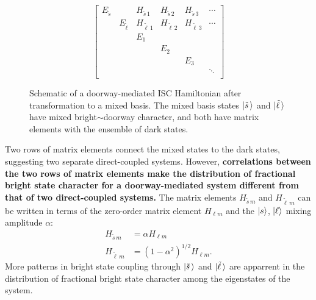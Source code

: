 \documentclass[12pt]{mitthesis}
\newcommand{\ts}{\tilde{s}\,}
\newcommand{\tl}{\tilde{\ell}\,}
\begin{document}
\begin{figure}
  \caption{Schematic of a doorway-mediated ISC Hamiltonian after
    transformation to a mixed basis. The mixed basis states
    $\ket{\ts}$ and $\ket{\tl}$ have mixed bright$\sim$doorway
    character, and both have matrix elements with the ensemble of dark
    states.}
  \label{fig:matrix-mixed}
  \begin{equation*}
    \begin{bmatrix}
      E_{\ts} & & H_{\ts 1} & H_{\ts 2} & H_{\ts 3} & \dotsm \\
      & E_{\tl} & H_{\tl 1} & H_{\tl 2} & H_{\tl 3} & \dotsm \\
      & & E_1 \\
      & & & E_2 \\
      & & & & E_3 \\
      & & & & & \ddots \\
    \end{bmatrix}
  \end{equation*}
\end{figure}

Two rows of matrix elements connect the mixed states to the dark
states, suggesting two separate direct-coupled systems. However,
\textbf{correlations between the two rows of matrix elements make the
  distribution of fractional bright state character for a
  doorway-mediated system different from that of two direct-coupled
  systems.}  The matrix elements $H_{\ts m}$ and $H_{\tl m}$ can be
written in terms of the zero-order matrix element $H_{\ell m}$ and the
$\mathinner{|{s}\rangle}$, $\mathinner{|{\ell}\rangle}$ mixing amplitude $\alpha$:
\begin{equation}
  \begin{split}
    H_{\ts m} &= \alpha H_{\ell m}\\
    H_{\tl m} &= (1-\alpha^2)^{1/2} H_{\ell m}.
  \end{split}
\end{equation}
More patterns in bright state coupling through $\ket{\ts}$ and
$\ket{\tl}$ are apparrent in the distribution of fractional
bright state character among the eigenstates of the system.
\end{document}
